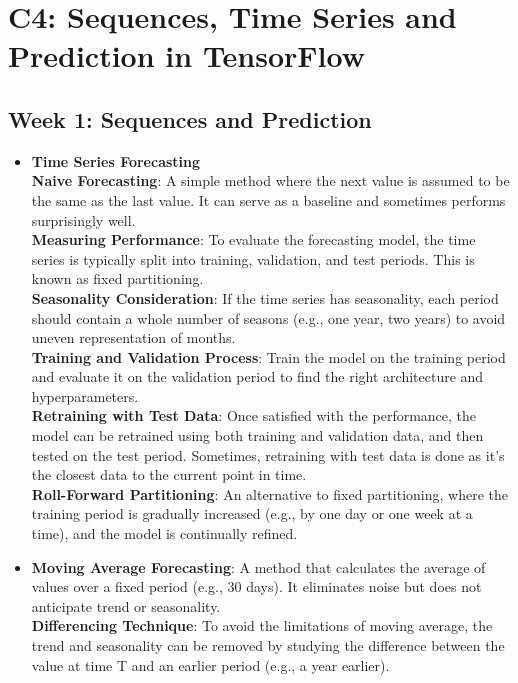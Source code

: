 \documentclass[20pt]{article}
\begin{document}
	\section{C4: Sequences, Time Series and Prediction in TensorFlow}
	\subsection{Week 1: Sequences and Prediction}
	\begin{itemize}
		\item \textbf{Time Series Forecasting}\\
		\textbf{Naive Forecasting}: A simple method where the next value is assumed to be the same as the last value. It can serve as a baseline and sometimes performs surprisingly well.\\
		\textbf{Measuring Performance}: To evaluate the forecasting model, the time series is typically split into training, validation, and test periods. This is known as fixed partitioning.\\
		\textbf{Seasonality Consideration}: If the time series has seasonality, each period should contain a whole number of seasons (e.g., one year, two years) to avoid uneven representation of months.\\
		\textbf{Training and Validation Process}: Train the model on the training period and evaluate it on the validation period to find the right architecture and hyperparameters.\\
		\textbf{Retraining with Test Data}: Once satisfied with the performance, the model can be retrained using both training and validation data, and then tested on the test period. Sometimes, retraining with test data is done as it's the closest data to the current point in time.\\
		\textbf{Roll-Forward Partitioning}: An alternative to fixed partitioning, where the training period is gradually increased (e.g., by one day or one week at a time), and the model is continually refined.\\
		\item \textbf{Moving Average Forecasting}: A method that calculates the average of values over a fixed period (e.g., 30 days). It eliminates noise but does not anticipate trend or seasonality.\\
		\textbf{Differencing Technique}: To avoid the limitations of moving average, the trend and seasonality can be removed by studying the difference between the value at time T and an earlier period (e.g., a year earlier).\\

\end{itemize}
\end{document}
